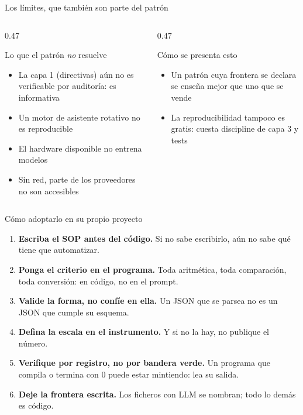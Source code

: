 \documentclass[aspectratio=169,11pt]{beamer}
\begin{document}
\begin{frame}{Los límites, que también son parte del patrón}
  \begin{columns}[T]
    \begin{column}{0.47\textwidth}
      \begin{alertblock}{Lo que el patrón \emph{no} resuelve}
        \begin{itemize}
          \item La capa 1 (directivas) aún no es verificable por auditoría:
                es informativa
          \item Un motor de asistente rotativo no es reproducible
          \item El hardware disponible no entrena modelos
          \item Sin red, parte de los proveedores no son accesibles
        \end{itemize}
      \end{alertblock}
    \end{column}
    \begin{column}{0.47\textwidth}
      \begin{exampleblock}{Cómo se presenta esto}
        \begin{itemize}
          \item Un patrón cuya frontera se declara se enseña mejor que uno que
                se vende
          \item La reproducibilidad tampoco es gratis: cuesta discipline
                de capa 3 y tests
        \end{itemize}
      \end{exampleblock}
    \end{column}
  \end{columns}
\end{frame}

\begin{frame}{Cómo adoptarlo en su propio proyecto}
  \begin{enumerate}
    \item \textbf{Escriba el SOP antes del código.} Si no sabe escribirlo, aún
          no sabe qué tiene que automatizar.
    \item \textbf{Ponga el criterio en el programa.} Toda aritmética, toda
          comparación, toda conversión: en código, no en el prompt.
    \item \textbf{Valide la forma, no confíe en ella.} Un JSON que se parsea
          no es un JSON que cumple su esquema.
    \item \textbf{Defina la escala en el instrumento.} Y si no la hay, no
          publique el número.
    \item \textbf{Verifique por registro, no por bandera verde.} Un programa
          que compila o termina con 0 puede estar mintiendo: lea su salida.
    \item \textbf{Deje la frontera escrita.} Los ficheros con LLM se nombran;
          todo lo demás es código.
  \end{enumerate}
\end{frame}
\end{document}
